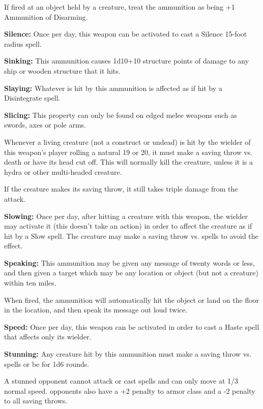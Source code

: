 \begin{multicols*}{2}
If fired at an object held by a creature, treat the ammunition as being +1 Ammunition of Disarming.

\textbf{Silence:} Once per day, this weapon can be activated to cast a Silence 15-foot radius spell.

\textbf{Sinking:} This ammunition causes 1d10+10 structure points of damage to any ship or wooden structure that it hits.

\textbf{Slaying:} Whatever is hit by this ammunition is affected as if hit by a Disintegrate spell.

\textbf{Slicing:} This property can only be found on edged melee weapons such as swords, axes or pole arms.

Whenever a living creature (not a construct or undead) is hit by the wielder of this weapon’s player rolling a natural 19 or 20, it must make a saving throw vs. death or have its head cut off. This will normally kill the creature, unless it is a hydra or other multi-headed creature.

If the creature makes its saving throw, it still takes triple damage from the attack.

\textbf{Slowing:} Once per day, after hitting a creature with this weapon, the wielder may activate it (this doesn’t take an action) in order to affect the creature as if hit by a Slow spell. The creature may make a saving throw vs. spells to avoid the effect.

\textbf{Speaking:} This ammunition may be given any message of twenty words or less, and then given a target which may be any location or object (but not a creature) within ten miles.

When fired, the ammunition will automatically hit the object or land on the floor in the location, and then speak its message out loud twice.

\textbf{Speed:} Once per day, this weapon can be activated in order to cast a Haste spell that affects only its wielder.

\textbf{Stunning:} Any creature hit by this ammunition must make a saving throw vs. spells or be   for 1d6 rounds.

A stunned opponent cannot attack or cast spells and can only move at 1/3 normal speed.  opponents also have a +2 penalty to armor class and a -2 penalty to all saving throws.


\end{multicols*}
